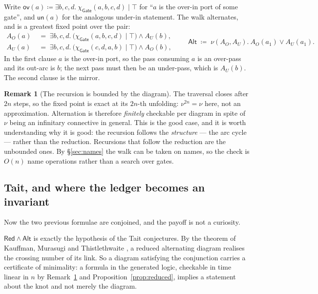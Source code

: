 \documentclass[11pt]{article}
\theoremstyle{definition}
\newtheorem{remark}{Remark}
\newcommand{\Gate}{\mathsf{Gate}}
\newcommand{\charf}[1]{\chi_{#1}}
\newcommand{\sep}{\mathbin{\vert}}
\begin{document}
Write $\mathsf{ov}(a) \coloneqq \exists b,c,d.\ \charf{\Gate}(a,b,c,d) \sep \top$
for ``$a$ is the over-in port of some gate'', and $\mathsf{un}(a)$ for the
analogous under-in statement. The walk alternates, and is a greatest fixed point
over the pair:
\[
\begin{aligned}
A_{O}(a) &\;=\; \exists b,c,d.\ \bigl(\charf{\Gate}(a,b,c,d) \sep \top\bigr) \wedge A_{U}(b),\\
A_{U}(a) &\;=\; \exists b,c,d.\ \bigl(\charf{\Gate}(c,d,a,b) \sep \top\bigr) \wedge A_{O}(b),
\end{aligned}
\qquad
\mathsf{Alt} \;\coloneqq\; \nu (A_O, A_U).\ A_O(a_1) \vee A_U(a_1).
\]
In the first clause $a$ is the over-in port, so the pass consuming $a$ is an
over-pass and its out-arc is $b$; the next pass must then be an under-pass, which
is $A_U(b)$. The second clause is the mirror.

\begin{remark}[The recursion is bounded by the diagram]\label{rem:bounded}
The traversal closes after $2n$ steps, so the fixed point is exact at its $2n$-th
unfolding: $\nu^{2n} = \nu$ here, not an approximation. Alternation is therefore
\emph{finitely} checkable per diagram in spite of $\nu$ being an infinitary
connective in general. This is the good case, and it is worth understanding why it
is good: the recursion follows the \emph{structure} --- the arc cycle --- rather
than the reduction. Recursions that follow the reduction are the unbounded ones.
By \S\ref{sec:names} the walk can be taken on names, so the check is $O(n)$ name
operations rather than a search over gates.
\end{remark}

\subsection{Tait, and where the ledger becomes an invariant}\label{sec:tait}

Now the two previous formulae are conjoined, and the payoff is not a curiosity.

$\mathsf{Red} \wedge \mathsf{Alt}$ is exactly the hypothesis of the Tait
conjectures. By the theorem of Kauffman, Murasugi and Thistlethwaite
\cite{kauffman,murasugi,thistlethwaite}, a reduced alternating diagram realises
the crossing number of its link. So a diagram satisfying the conjunction carries a
certificate of minimality: a formula in the generated logic, checkable in time
linear in $n$ by Remark~\ref{rem:bounded} and Proposition~\ref{prop:reduced},
implies a statement about the knot and not merely the diagram.
\end{document}
